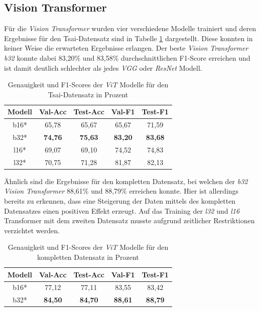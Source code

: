 \documentclass[twoside,a4paper]{IEEEtran}
\begin{document}
\subsection{Vision Transformer}
Für die \emph{Vision Transformer} wurden vier verschiedene Modelle trainiert und deren Ergebnisse für den Tsai-Datensatz sind in Tabelle \ref{vit_ergebnis_tsai} dargestellt. Diese konnten in keiner Weise die erwarteten Ergebnisse erlangen. Der beste \emph{Vision Transformer} \emph{b32} konnte dabei 83,20\% und 83,58\% durchschnittlichen F1-Score erreichen und ist damit deutlich schlechter als jedes \emph{VGG} oder \emph{ResNet} Modell.
\begin{table}[!htb]
	\caption{Genauigkeit und F1-Scores der \emph{ViT} Modelle für den Tsai-Datensatz in Prozent}
	\label{vit_ergebnis_tsai}
	\centering
	\begin{tabular}{|c|c|c|c|c|}
		\hline
		Modell & Val-Acc & Test-Acc & Val-F1 & Test-F1\\
		\hline
		\hline
		b16* & 65,78 & 65,67 & 65,67 & 71,59\\
		\hline
		b32* & \textbf{74,76} & \textbf{75,63} & \textbf{83,20} & \textbf{83,68}\\
		\hline
		l16* & 69,07 & 69,10 & 74,52 & 74,83\\
		\hline
		l32* & 70,75 & 71,28 & 81,87 & 82,13\\
		\hline 
	\end{tabular}
\end{table}

Ähnlich sind die Ergebnisse für den kompletten Datensatz, bei welchen der \emph{b32} \emph{Vision Transformer} 88,61\% und 88,79\% erreichen konnte. Hier ist allerdings bereits zu erkennen, dass eine Steigerung der Daten mittels des kompletten Datensatzes einen positiven Effekt erzeugt. Auf das Training der \emph{l32} und \emph{l16} Transformer mit dem zweiten Datensatz musste aufgrund zeitlicher Restriktionen verzichtet werden.
\begin{table}[!htb]
	\caption{Genauigkeit und F1-Scores der \emph{ViT} Modelle für den kompletten Datensatz in Prozent}
	\label{vit_ergebnis_full}
	\centering
	\begin{tabular}{|c|c|c|c|c|}
		\hline
		Modell & Val-Acc & Test-Acc & Val-F1 & Test-F1\\
		\hline
		\hline 
		b16* & 77,12 & 77,11 & 83,55 & 83,42\\
		\hline
		b32* & \textbf{84,50} & \textbf{84,70} & \textbf{88,61} & \textbf{88,79}\\
		\hline 
	\end{tabular}
\end{table}
\end{document}
